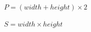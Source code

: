 \documentclass{article}
\begin{document}
$ P = (width + height) \times 2 $
\pagebreak

$ S = width \times height $
\pagebreak
\end{document}
